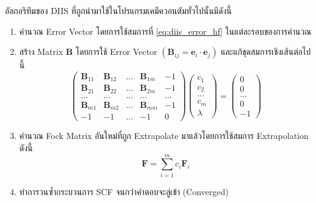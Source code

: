 อัลกอริทึมของ DIIS ที่ถูกนำมาใช้ในโปรแกรมเคมีควอนตัมทั่วไปนั้นมีดังนี้
%
\begin{enumerate}[topsep=0pt,noitemsep]
  \setlength\itemsep{0.5em}
  \item คำนวณ Error Vector โดยการใช้สมการที่ \eqref{eq:diis_error_hf} ในแต่ละรอบของการคำนวณ

  \item สร้าง Matrix $\mathbf{B}$ โดยการใช้ Error Vector $(\mathbf{B}_{ij} = \mathbf{e}_i \cdot \mathbf{e}_j)$ และแก้ชุดสมการเชิงเส้นต่อไปนี้
        \begin{equation}
          \begin{pmatrix}
            \mathbf{B}_{11} & \mathbf{B}_{12} & \dots & \mathbf{B}_{1m} & -1    \\
            \mathbf{B}_{21} & \mathbf{B}_{22} & \dots & \mathbf{B}_{2m} & -1    \\
            \dots           & \dots           & \dots & \dots           & \dots \\
            \mathbf{B}_{m1} & \mathbf{B}_{m2} & \dots & \mathbf{B}_{mm} & -1    \\
            -1              & -1              & \dots & -1              & 0
          \end{pmatrix}
          \begin{pmatrix}
            c_1   \\
            c_2   \\
            \dots \\
            c_m   \\
            \lambda
          \end{pmatrix}
          =
          \begin{pmatrix}
            0     \\
            0     \\
            \dots \\
            0     \\
            -1
          \end{pmatrix}
        \end{equation}

  \item คำนวณ Fock Matrix อันใหม่ที่ถูก Extrapolate มาแล้วโดยการใช้สมการ Extrapolation ดังนี้
        \begin{equation}
          \mathbf{F}
          =
          \sum_{i=1}^{m} c_i \mathbf{F}_i
        \end{equation}

  \item ทำการวนซ้ำกระบวนการ SCF จนกว่าคำตอบจะลู่เข้า (Converged)
\end{enumerate}

